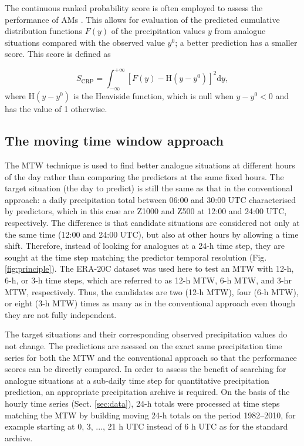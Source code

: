 \documentclass[hess, manuscript]{copernicus}
\begin{document}
	The continuous ranked probability score \citep[CRPS,][]{Brown1974, Matheson1976, Hersbach2000} is often employed to assess the performance of AMs \citep[e.g.][]{Bontron2004, Bontron2005, BenDaoud2008, Horton2012, Marty2012, Radanovics2013, Chardon2014, Junk2015, BenDaoud2016, Caillouet2016}. This allows for evaluation of the predicted cumulative distribution functions $F(y)$ of the precipitation values $y$ from analogue situations compared with the observed value $y^{0}$; a better prediction has a smaller score. This score is defined as 
	
	\begin{equation}
	\label{eq:CRPS}
	S_{\text{CRP}} = \int_{-\infty}^{+\infty} \left[ F(y)-\text{H}(y-y^{0})\right]^{2} \text{d}y ,  
	\end{equation}
	where $\text{H}(y-y^{0})$ is the Heaviside function, which is null when $y-y^{0}<0$ and has the value of 1 otherwise.
	
	
	\subsection{The moving time window approach}
	\label{sec:mtw}
	
	The MTW technique is used to find better analogue situations at different hours of the day rather than comparing the predictors at the same fixed hours. The target situation (the day to predict) is still the same as that in the conventional approach: a daily precipitation total between 06:00 and 30:00 UTC characterised by predictors, which in this case are Z1000 and Z500 at 12:00 and 24:00 UTC, respectively. The difference is that candidate situations are considered not only at the same time (12:00 and 24:00 UTC), but also at other hours by allowing a time shift. Therefore, instead of looking for analogues at a 24-h time step, they are sought at the time step matching the predictor temporal resolution (Fig. \ref{fig:principle}). The ERA-20C dataset was used here to test an MTW with 12-h, 6-h, or 3-h time steps, which are referred to as 12-h MTW, 6-h MTW, and 3-hr MTW, respectively. Thus, the candidates are two (12-h MTW), four (6-h MTW), or eight (3-h MTW) times as many  as in the conventional approach even though they are not fully independent.
	
	The target situations and their corresponding observed precipitation values do not change. The predictions are asessed on the exact same precipitation time series for both the MTW and the conventional approach so that the performance scores can be directly compared. In order to assess the benefit of searching for analogue situations at a sub-daily time step for quantitative precipitation prediction, an appropriate precipitation archive is required. On the basis of the hourly time series (Sect. \ref{sec:data}), 24-h totals were processed at time steps matching the MTW by building moving 24-h totals on the period 1982--2010, for example starting at 0, 3, ..., 21 h UTC instead of 6 h UTC as for the standard archive.
	
\end{document}
